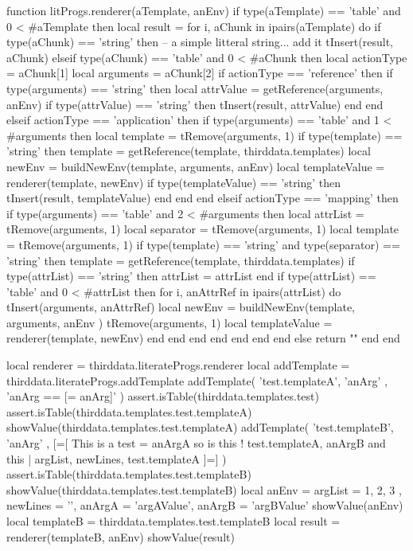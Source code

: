 {{\startLuaCode
function litProgs.renderer(aTemplate, anEnv)
  if type(aTemplate) == 'table' and 0 < #aTemplate then
    local result = { }
    for i, aChunk in ipairs(aTemplate) do
      if type(aChunk) == 'string' then
        -- a simple litteral string... add it
        tInsert(result, aChunk)
      elseif type(aChunk) == 'table' and 0 < #aChunk then
        local actionType = aChunk[1]
        local arguments  = aChunk[2]
        if actionType == 'reference' then
          if type(arguments) == 'string' then
            local attrValue = getReference(arguments, anEnv)
            if type(attrValue) == 'string' then
              tInsert(result, attrValue)
            end
          end
        elseif actionType == 'application' then
          if type(arguments) == 'table' and 1 < #arguments then
            local template = tRemove(arguments, 1)
            if type(template) == 'string' then
              template = getReference(template, thirddata.templates)
              local newEnv = buildNewEnv(template, arguments, anEnv)
              local templateValue = renderer(template, newEnv)
              if type(templateValue) == 'string' then
                tInsert(result, templateValue)
              end
            end
          end
        elseif actionType == 'mapping' then
          if type(arguments) == 'table' and 2 < #arguments then
            local attrList  = tRemove(arguments, 1)
            local separator = tRemove(arguments, 1)
            local template  = tRemove(arguments, 1)
            if type(template) == 'string' and type(separator) == 'string' then
              template = getReference(template, thirddata.templates)
              if type(attrList) == 'string' then
                attrList = { attrList }
              end
              if type(attrList) == 'table' and 0 < #attrList then
                for i, anAttrRef in ipairs(attrList) do
                  tInsert(arguments, anAttrRef)
                  local newEnv = buildNewEnv(template, arguments, anEnv )
                  tRemove(arguments, 1)
                  local templateValue = renderer(template, newEnv)
                end
              end
            end
          end
        end
      end
    end
  else
    return ""
  end
end
\stopLuaCode

\startLuaTest
local renderer    = thirddata.literateProgs.renderer
local addTemplate = thirddata.literateProgs.addTemplate
addTemplate( 
  'test.templateA',
  { 'anArg' },
  'anArg == [{{= anArg}}]'
)
assert.isTable(thirddata.templates.test)
assert.isTable(thirddata.templates.test.templateA)
showValue(thirddata.templates.test.templateA)
addTemplate(
  'test.templateB',
  { 'anArg' },
[=[
This is a test {{= anArgA }}
so is this {{! test.templateA, anArgB }}
and this {{| argList, newLines, test.templateA }}
]=]
)
assert.isTable(thirddata.templates.test.templateB)
showValue(thirddata.templates.test.templateB)
local anEnv = {
  argList = { 1, 2, 3 },
  newLines = '\n',
  anArgA = 'argAValue',
  anArgB = 'argBValue'
}
showValue(anEnv)
local templateB = thirddata.templates.test.templateB
local result = renderer(templateB, anEnv)
showValue(result)
\stopLuaTest
\showLuaTest
\stopTestCase

}}
